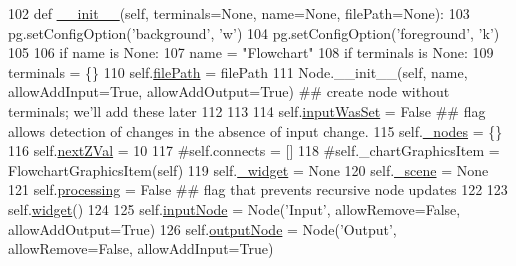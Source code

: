 \begin{DoxyCode}
102     \textcolor{keyword}{def }\hyperlink{classFlowchart_1_1Flowchart_ad01c1cfa5be95c82787f50ebdeced37c}{\_\_init\_\_}(self, terminals=None, name=None, filePath=None):
103         pg.setConfigOption(\textcolor{stringliteral}{'background'}, \textcolor{stringliteral}{'w'})
104         pg.setConfigOption(\textcolor{stringliteral}{'foreground'}, \textcolor{stringliteral}{'k'})
105         
106         \textcolor{keywordflow}{if} name \textcolor{keywordflow}{is} \textcolor{keywordtype}{None}:
107             name = \textcolor{stringliteral}{"Flowchart"}
108         \textcolor{keywordflow}{if} terminals \textcolor{keywordflow}{is} \textcolor{keywordtype}{None}:
109             terminals = \{\}
110         self.\hyperlink{classFlowchart_1_1Flowchart_ad3ef7026c868ea6f6b29d9431b28a4b9}{filePath} = filePath
111         Node.\_\_init\_\_(self, name, allowAddInput=\textcolor{keyword}{True}, allowAddOutput=\textcolor{keyword}{True})  \textcolor{comment}{## create node without
       terminals; we'll add these later}
112         
113         
114         self.\hyperlink{classFlowchart_1_1Flowchart_a3174a7d3c4a0a4c1d599c2b870e4aa49}{inputWasSet} = \textcolor{keyword}{False}  \textcolor{comment}{## flag allows detection of changes in the absence of input
       change.}
115         self.\hyperlink{classFlowchart_1_1Flowchart_aa3d2bb6a3e73dd5d1c011c4439231aa8}{\_nodes} = \{\}
116         self.\hyperlink{classFlowchart_1_1Flowchart_a5f0e24985b1b2e763104f6f3a0e7d36d}{nextZVal} = 10
117         \textcolor{comment}{#self.connects = []}
118         \textcolor{comment}{#self.\_chartGraphicsItem = FlowchartGraphicsItem(self)}
119         self.\hyperlink{classFlowchart_1_1Flowchart_a0f9252c7f3f8edc96bbb4647404f0495}{\_widget} = \textcolor{keywordtype}{None}
120         self.\hyperlink{classFlowchart_1_1Flowchart_a562508f2a7df6bc34929782c3b5a1dfc}{\_scene} = \textcolor{keywordtype}{None}
121         self.\hyperlink{classFlowchart_1_1Flowchart_a7a15f175c575286a959cf951028df731}{processing} = \textcolor{keyword}{False} \textcolor{comment}{## flag that prevents recursive node updates}
122         
123         self.\hyperlink{classFlowchart_1_1Flowchart_aedc60bdaa12f0f770f374c092627152f}{widget}()
124         
125         self.\hyperlink{classFlowchart_1_1Flowchart_a84ef6d80eda5bb411ed8fc42d498abf8}{inputNode} = Node(\textcolor{stringliteral}{'Input'}, allowRemove=\textcolor{keyword}{False}, allowAddOutput=\textcolor{keyword}{True})
126         self.\hyperlink{classFlowchart_1_1Flowchart_a40f1e9146fe716f08de3e409e928cfd0}{outputNode} = Node(\textcolor{stringliteral}{'Output'}, allowRemove=\textcolor{keyword}{False}, allowAddInput=\textcolor{keyword}{True})

\end{DoxyCode}
